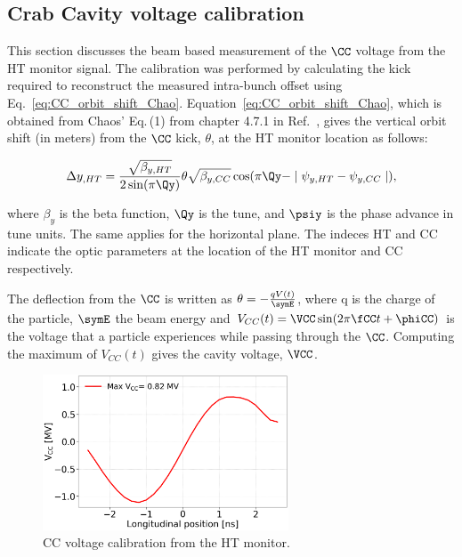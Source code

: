  \subsection{Crab Cavity voltage calibration}\label{sec:Vcc_calibration}
 This section discusses the beam based measurement of the $\CC$ voltage from the HT monitor signal. The calibration was performed by calculating the kick required to reconstruct the measured intra-bunch offset using Eq.~\eqref{eq:CC_orbit_shift_Chao}. Equation~\eqref{eq:CC_orbit_shift_Chao}, which is obtained from Chaos' Eq.\,(1) from chapter 4.7.1 in Ref.~\cite{Chao:1490001}, gives the vertical orbit shift (in meters) from the $\CC$ kick, $\theta$, at the HT monitor location as follows:


\begin{equation}\label{eq:CC_orbit_shift_Chao}
   \Delta y_{,HT} = \frac{\sqrt{\beta_{y, HT}}}{2 \sin(\pi \Qy)} \theta \sqrt{\beta_{y, CC}} \cos(\pi \Qy - \mid \psi_{y, HT} - \psi_{y, CC} \mid),
\end{equation}

where $\beta_y$ is the beta function, $\Qy$ is the tune, and $\psiy$ is the phase advance in tune units. The same applies for the horizontal plane. The indeces HT and CC indicate the optic parameters at the location of the HT monitor and CC respectively.

The deflection from the $\CC$ is written as $\theta = - \frac{q V(t)}{\symE}$, where q is the charge of the particle, $\symE$ the beam energy and $V_{CC}(t) = \VCC \sin(2 \pi \fCC t + \phiCC) $ is the voltage that a particle experiences while passing through the $\CC$. Computing the maximum of $V_{CC}(t)$ gives the cavity voltage, $\VCC$. 

\begin{figure}[!h]
\centering         
\includegraphics[width=0.65\textwidth]{images/Ch4/HT_VCC_callibration_20180530_135105.png}
    \caption{CC voltage calibration from the HT monitor.}
    \label{fig:VCC_from_HT_monitor_measurement}
\end{figure}

